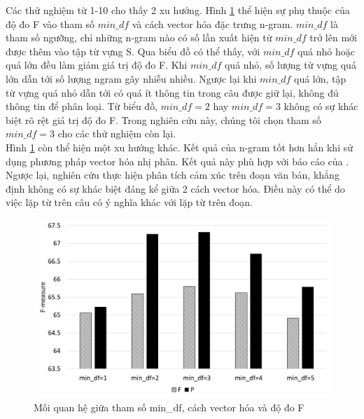 Các thử nghiệm từ 1-10 cho thấy 2 xu hướng. Hình \ref{fig:mindf-p-f} thể hiện sự phụ thuộc của độ đo F vào tham số $min\_df$ và cách vector hóa đặc trưng n-gram. $min\_df$ là tham số ngưỡng, chỉ những n-gram nào có số lần xuất hiện từ $min\_df$ trở lên mới được thêm vào tập từ vựng S. Qua biểu đồ có thể thấy, với $min\_df$ quá nhỏ hoặc quá lớn đều làm giảm giá trị độ đo F. Khi $min\_df$ quá nhỏ, số lượng từ vựng quá lớn dẫn tới số lượng ngram gây nhiễu nhiều. Ngược lại khi $min\_df$ quá lớn, tập từ vựng quá nhỏ dẫn tới có quá ít thông tin trong câu được giữ lại, không đủ thông tin để phân loại. Từ biểu đồ, $min\_df=2$ hay $min\_df=3$ không có sự khác biệt rõ rệt giá trị độ đo F. Trong nghiên cứu này, chúng tôi chọn tham số $min\_df=3$ cho các thử nghiệm còn lại.\\

Hình \ref{fig:mindf-p-f} còn thể hiện một xu hướng khác. Kết quả của n-gram tốt hơn hẳn khi sử dụng phương pháp vector hóa nhị phân. Kết quả này phù hợp với báo cáo của \cite{pang2002thumbs}. Ngược lại, nghiên cứu \cite{sarker2011outcome} thực hiện phân tích cảm xúc trên đoạn văn bản, khẳng định không có sự khác biệt đáng kể giữa 2 cách vector hóa. Điều này có thể do việc lặp từ trên câu có ý nghĩa khác với lặp từ trên đoạn.\\

\begin{figure}[H]
\centering
\includegraphics[scale=0.25]{../hinh/mindf_p_f.png}
\caption{Mối quan hệ giữa tham số min\_df, cách vector hóa và độ đo F} \label{fig:mindf-p-f}
\end{figure}

